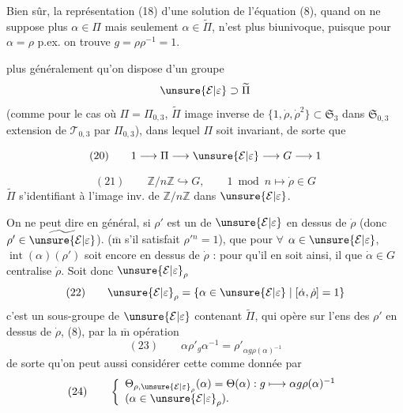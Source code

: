 Bien sûr, la représentation (18) d'une solution de l'équation (8),  quand on ne suppose plus $\alpha\in\Pi$ mais seulement $\alpha\in\widetilde\Pi$, n'est plus biunivoque, puisque pour $\alpha=\rho$ p.ex. on trouve  $g=\rho\rho^{-1}=1$.

 plus généralement qu'on dispose d'un groupe
\[
\unsure{\mathcal E|\varepsilon}\supset\widetilde\Pi
\]
(comme pour le  cas où $\Pi=\Pi_{0,3}$, $\widetilde\Pi$ image inverse de $\{1,\dot\rho,\dot\rho^2\}\subset\mathfrak S_3$ dans $\mathfrak S_{0,3}$ extension de $\mathcal T_{0,3}$ par $\Pi_{0,3}$), dans lequel $\Pi$ soit invariant, de sorte que 



\[
(20)\qquad 1\longrightarrow\Pi\longrightarrow\unsure{\mathcal E|\varepsilon}\longrightarrow G\longrightarrow1
\]


\[
(21)\qquad \mathbb Z/n\mathbb Z\hookrightarrow G,\qquad
1\bmod n\longmapsto\dot\rho\in G
\]
$\widetilde\Pi$ s'identifiant à l'image inv. de $\mathbb Z/n\mathbb Z$ dans $\unsure{\mathcal E|\varepsilon}$.

On ne peut dire en général, si $\rho'$ est un  de $\unsure{\mathcal E|\varepsilon}$ en dessus de $\dot\rho$ (donc $\rho'\in\widetilde{\unsure{\mathcal E|\varepsilon}}$).
($\overline{\mathrm m}$ s'il satisfait $\rho'{}^n=1$), que pour $\forall$ $\alpha\in\unsure{\mathcal E|\varepsilon}$, $\operatorname{int}(\alpha)(\rho')$ soit encore en dessus de $\dot\rho$ :
pour qu'il en soit ainsi, il  que $\dot\alpha\in G$ centralise $\dot\rho$. Soit donc $\unsure{\mathcal E|\varepsilon}_\rho$
\[
(22)\qquad
\unsure{\mathcal E|\varepsilon}_\rho=\{\alpha\in\unsure{\mathcal E|\varepsilon}\mid[\dot\alpha,\dot\rho]=1\}
\]
c'est un sous-groupe de $\unsure{\mathcal E|\varepsilon}$ contenant $\widetilde\Pi$, qui
 opère sur l'ens des  $\rho'$ en dessus de $\dot\rho$,
 (8),  par la $\overline{\mathrm m}$ opération
\[
(23)\qquad
\alpha\rho'_g\alpha^{-1}=\rho'_{\alpha g\rho(\alpha)^{-1}}
\]
de sorte qu'on peut aussi considérer cette  comme donnée par
\[
(24)\qquad
\left\{
\begin{array}{l}
\Theta_{\rho,\unsure{\mathcal E|\varepsilon}_\rho}(\alpha)=\Theta(\alpha):
g\longmapsto\alpha g\rho(\alpha)^{-1}\\
(\alpha\in\unsure{\mathcal E|\varepsilon}_\rho).
\end{array}
\right.
\]

